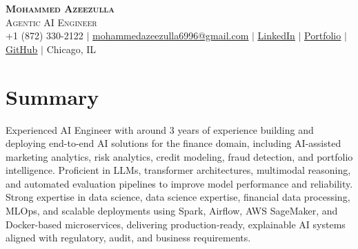 \documentclass[letterpaper,11pt]{article}
\begin{document}
\begin{center}
    \textbf{\LARGE \scshape Mohammed Azeezulla} \\ \vspace{1pt}
    \small\textsc{Agentic AI Engineer} \\ \vspace{1pt}
    \small +1 (872) 330-2122 $|$ \href{mailto:mohammedazeezulla6996@gmail.com}{\underline{mohammedazeezulla6996@gmail.com}} $|$ \href{LINKEDIN_URL}{\underline{LinkedIn}} $|$ \href{PORTFOLIO_URL}{\underline{Portfolio}} $|$ \href{GITHUB_URL}{\underline{GitHub}} $|$ Chicago, IL
\end{center}

\vspace{4pt}
\section{Summary}
\vspace{-4pt}
\small{
Experienced AI Engineer with around 3 years of experience building and deploying end-to-end AI solutions for the finance domain, including AI-assisted marketing analytics, risk analytics, credit modeling, fraud detection, and portfolio intelligence. Proficient in LLMs, transformer architectures, multimodal reasoning, and automated evaluation pipelines to improve model performance and reliability. Strong expertise in data science, data science expertise, financial data processing, MLOps, and scalable deployments using Spark, Airflow, AWS SageMaker, and Docker-based microservices, delivering production-ready, explainable AI systems aligned with regulatory, audit, and business requirements.
} \vspace{2pt}
\end{document}

